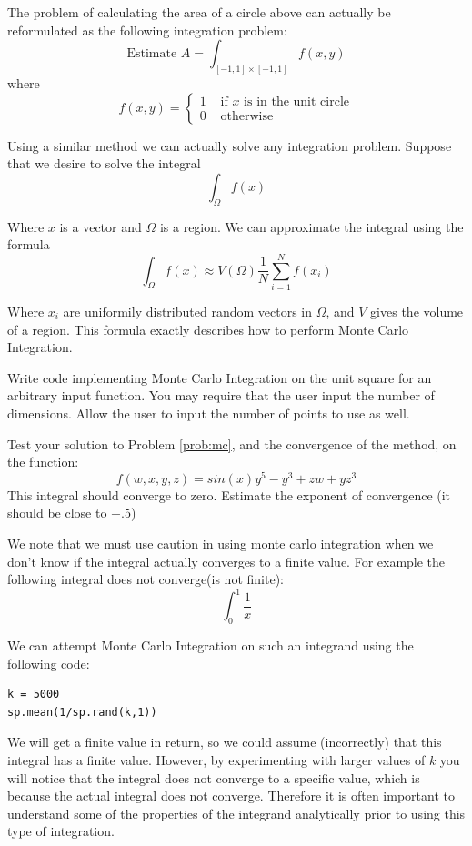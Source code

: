 The problem of calculating the area of a circle above can actually be reformulated as the following integration problem:
\[
\mbox{Estimate }A = \int_{[-1,1]\times[-1,1]} f(x,y)
\]
where
\[
f(x,y) = \begin{cases} 1 &\mbox{ if $x$ is in the unit circle} \\ 0 &\mbox{ otherwise} \end{cases}
\]

Using a similar method we can actually solve any integration problem. Suppose that we desire to solve the integral
\[
\int_\Omega f(x)
\]

Where $x$ is a vector and $\Omega$ is a region. We can approximate the integral using the formula
\[
\int_\Omega f(x) \approx V(\Omega) \frac{1}{N} \sum_{i=1}^N f(x_i)
\]

Where $x_i$ are uniformily distributed random vectors in $\Omega$, and $V$ gives the volume of a region. This formula exactly describes how to perform Monte Carlo Integration.

\begin{problem}
\label{prob:mc}
Write code implementing Monte Carlo Integration on the unit square for an arbitrary input function. You may require that the user input the number of dimensions. Allow the user to input the number of points to use as well.
\end{problem}

\begin{problem}
\label{prob:mc_test}
Test your solution to Problem \ref{prob:mc}, and the convergence of the method, on the function:
\[
f(w,x,y,z) = sin(x) y^5 -y^3 + zw + yz^3
\]
This integral should converge to zero. Estimate the exponent of convergence (it should be close to $-.5$)
\end{problem}

We note that we must use caution in using monte carlo integration when we don't know if the integral actually converges to a finite value. For example the following integral does not converge(is not finite):
\[
\int_0^1 \frac{1}{x}
\]

We can attempt Monte Carlo Integration on such an integrand using the following code:
\begin{lstlisting}[style=python]
k = 5000
sp.mean(1/sp.rand(k,1))
\end{lstlisting}

We will get a finite value in return, so we could assume (incorrectly) that this integral has a finite value. However, by experimenting with larger values of $k$ you will notice that the integral does not converge to a specific value, which is because the actual integral does not converge. Therefore it is often important to understand some of the properties of the integrand analytically prior to using this type of integration.

